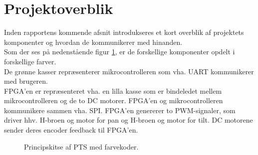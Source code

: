 \section{Projektoverblik}
\label{sec:projektoverblik}
Inden rapportens kommende afsnit introdukseres et kort overblik af projektets komponenter og hvordan de kommunikerer med hinanden.\\
Som der ses på nedenstående figur \ref{fig:overview_openloop_PTS}, er de forskellige komponenter opdelt i forskellige farver.\\
De grønne kasser repræsenterer mikrocontrolleren som vha. UART kommunikerer med brugeren. \\
FPGA'en er repræsenteret vha. en lilla kasse som er bindeledet mellem mikrocontrolleren og de to DC motorer. FPGA'en og mikrocontrolleren kommunikere sammen vha. SPI. FPGA'en genererer to PWM-signaler, som driver hhv. H-broen og motor for pan og H-broen og motor for tilt. DC motorene sender deres encoder feedback til FPGA'en.
\bigskip

\begin{figure}[!th]
\centering
\begin{tikzpicture}[auto, node distance=1cm,>=latex']

\end{tikzpicture}
\caption[Principskitse af PTS]{Principskitse af PTS med farvekoder.}
\label{fig:overview_openloop_PTS}
\end{figure}
